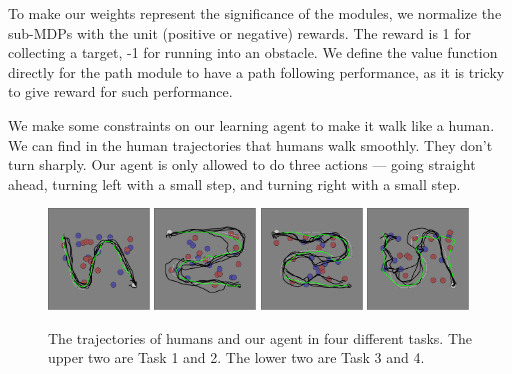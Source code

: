 \documentclass[11pt]{article} %
\begin{document}
To make our weights represent the significance of the modules, we
normalize the sub-MDPs with the unit (positive or negative) rewards. The reward
is 1 for collecting a target, -1 for running into an obstacle. We define the
value function directly for the path module to have a path following
performance, as it is tricky to give reward for such performance.

We make some constraints on our learning agent to make it walk like a human.
We can find in the human trajectories that humans walk smoothly. They don't turn
sharply.  Our agent is only allowed to do three actions --- going straight ahead,
turning left with a small step, and turning right with a small step.

\begin{figure}[h!]
\centering
\includegraphics[width=0.24\textwidth]{task_1.png}
\includegraphics[width=0.24\textwidth]{task_2.png}
\includegraphics[width=0.24\textwidth]{task_3.png}
\includegraphics[width=0.24\textwidth]{task_4.png}
\caption{The trajectories of humans and our agent in four different tasks. The
upper two are Task 1 and 2. The lower two are Task 3 and 4.}
\label{fig:exp}
\end{figure}
\end{document}

